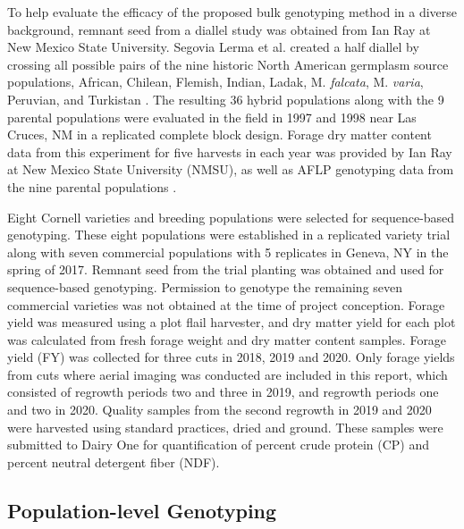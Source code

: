 \documentclass[12pt, letterpaper]{article}
\begin{document}
To help evaluate the efficacy of the proposed bulk genotyping method in a diverse background, remnant seed from a diallel study \parencite{segovia2004} was obtained from Ian Ray at New Mexico State University. Segovia Lerma et al. \parencite*{segovia2004} created a half diallel by crossing all possible pairs of the nine historic North American germplasm source populations, African, Chilean, Flemish, Indian, Ladak, M. \emph{falcata}, M. \emph{varia}, Peruvian, and Turkistan \parencite{barnes1977}. The resulting 36 hybrid populations along with the 9 parental populations were evaluated in the field in 1997 and 1998 near Las Cruces, NM in a replicated complete block design. Forage dry matter content data from this experiment for five harvests in each year was provided by Ian Ray at New Mexico State University (NMSU), as well as AFLP genotyping data from the nine parental populations \parencite[1544 AFLP markers;][]{segovia2004}.

Eight Cornell varieties and breeding populations were selected for sequence-based genotyping. These eight populations were established in a replicated variety trial along with seven commercial populations with 5 replicates in Geneva, NY in the spring of 2017. Remnant seed from the trial planting was obtained and used for sequence-based genotyping. Permission to genotype the remaining seven commercial varieties was not obtained at the time of project conception. Forage yield was measured using a plot flail harvester, and dry matter yield for each plot was calculated from fresh forage weight and dry matter content samples. Forage yield (FY) was collected for three cuts in 2018, 2019 and 2020. Only forage yields from cuts where aerial imaging was conducted are included in this report, which consisted of regrowth periods two and three in 2019, and regrowth periods one and two in 2020. Quality samples from the second regrowth in 2019 and 2020 were harvested using standard practices, dried and ground. These samples were submitted to Dairy One for quantification of percent crude protein (CP) and percent neutral detergent fiber (NDF).

% 

\subsection{Population-level Genotyping}
\end{document}

